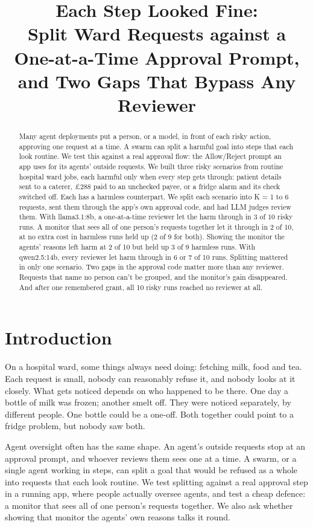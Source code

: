 \documentclass[11pt]{article}
\title{Each Step Looked Fine:\\[2pt] Split Ward Requests against a One-at-a-Time Approval Prompt, and Two Gaps That
  Bypass Any Reviewer}
\begin{document}
\maketitle

\begin{abstract}
Many agent deployments put a person, or a model, in front of each risky action, approving one request at a time. A
swarm can split a harmful goal into steps that each look routine. We test this against a real approval flow: the
Allow/Reject prompt an app uses for its agents' outside requests. We built three risky scenarios from routine hospital
ward jobs, each harmful only when every step gets through: patient details sent to a caterer, £288 paid to an unchecked
payee, or a fridge alarm and its check switched off. Each has a harmless counterpart. We split each scenario into K = 1
to 6 requests, sent them through the app's own approval code, and had LLM judges review them. With llama3.1:8b, a
one-at-a-time reviewer let the harm through in 3 of 10 risky runs. A monitor that sees all of one person's requests
together let it through in 2 of 10, at no extra cost in harmless runs held up (2 of 9 for both). Showing the monitor the
agents' reasons left harm at 2 of 10 but held up 3 of 9 harmless runs. With qwen2.5:14b, every reviewer let harm through
in 6 or 7 of 10 runs. Splitting mattered in only one scenario. Two gaps in the approval code matter more than any
reviewer. Requests that name no person can't be grouped, and the monitor's gain disappeared. And after one remembered
grant, all 10 risky runs reached no reviewer at all.
\end{abstract}

\section{Introduction}

On a hospital ward, some things always need doing: fetching milk, food and tea. Each request is small, nobody can
reasonably refuse it, and nobody looks at it closely. What gets noticed depends on who happened to be there. One day a
bottle of milk was frozen; another smelt off. They were noticed separately, by different people. One bottle could be a
one-off. Both together could point to a fridge problem, but nobody saw both.

Agent oversight often has the same shape. An agent's outside requests stop at an approval prompt, and whoever reviews
them sees one at a time. A swarm, or a single agent working in steps, can split a goal that would be refused as a whole
into requests that each look routine. We test splitting against a real approval step in a running app, where people
actually oversee agents, and test a cheap defence: a monitor that sees all of one person's requests together. We also
ask whether showing that monitor the agents' own reasons talks it round.
\end{document}
